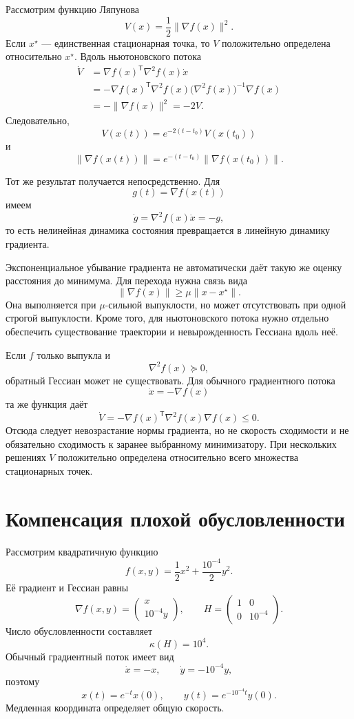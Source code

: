 Рассмотрим функцию Ляпунова
\[
    V(x)=\frac12\lVert\nabla f(x)\rVert^2.
\]
Если \(x^\star\) — единственная стационарная точка, то \(V\)
положительно определена относительно \(x^\star\). Вдоль
ньютоновского потока
\[
\begin{aligned}
    \dot V
    &=
    \nabla f(x)^{\mathsf T}\nabla^2f(x)\dot x
    \\
    &=
    -\nabla f(x)^{\mathsf T}\nabla^2f(x)
    \bigl(\nabla^2f(x)\bigr)^{-1}\nabla f(x)
    \\
    &=
    -\lVert\nabla f(x)\rVert^2
    =-2V.
\end{aligned}
\]
Следовательно,
\[
    V(x(t))
    =
    e^{-2(t-t_0)}V(x(t_0))
\]
и
\[
    \lVert\nabla f(x(t))\rVert
    =
    e^{-(t-t_0)}
    \lVert\nabla f(x(t_0))\rVert.
\]

Тот же результат получается непосредственно. Для
\[
    g(t)=\nabla f(x(t))
\]
имеем
\[
    \dot g
    =
    \nabla^2f(x)\dot x
    =-g,
\]
то есть нелинейная динамика состояния превращается в линейную
динамику градиента.

Экспоненциальное убывание градиента не автоматически даёт такую же
оценку расстояния до минимума. Для перехода нужна связь вида
\[
    \lVert\nabla f(x)\rVert
    \ge
    \mu\lVert x-x^\star\rVert.
\]
Она выполняется при \(\mu\)-сильной выпуклости, но может отсутствовать
при одной строгой выпуклости. Кроме того, для ньютоновского потока
нужно отдельно обеспечить существование траектории и невырожденность
Гессиана вдоль неё.

Если \(f\) только выпукла и
\[
    \nabla^2f(x)\succeq0,
\]
обратный Гессиан может не существовать. Для обычного градиентного
потока
\[
    \dot x=-\nabla f(x)
\]
та же функция даёт
\[
    \dot V
    =
    -\nabla f(x)^{\mathsf T}\nabla^2f(x)\nabla f(x)
    \le0.
\]
Отсюда следует невозрастание нормы градиента, но не скорость
сходимости и не обязательно сходимость к заранее выбранному
минимизатору. При нескольких решениях \(V\) положительно определена
относительно всего множества стационарных точек.

\section{Компенсация плохой обусловленности}

Рассмотрим квадратичную функцию
\[
    f(x,y)
    =
    \frac12x^2+
    \frac{10^{-4}}2y^2.
\]
Её градиент и Гессиан равны
\[
    \nabla f(x,y)
    =
    \begin{pmatrix}
        x\\
        10^{-4}y
    \end{pmatrix},
    \qquad
    H
    =
    \begin{pmatrix}
        1&0\\
        0&10^{-4}
    \end{pmatrix}.
\]
Число обусловленности составляет
\[
    \kappa(H)=10^4.
\]
Обычный градиентный поток имеет вид
\[
    \dot x=-x,
    \qquad
    \dot y=-10^{-4}y,
\]
поэтому
\[
    x(t)=e^{-t}x(0),
    \qquad
    y(t)=e^{-10^{-4}t}y(0).
\]
Медленная координата определяет общую скорость.

